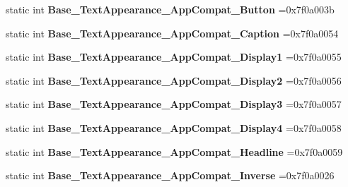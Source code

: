 \begin{DoxyCompactItemize}
\item 
\mbox{\label{classandroid_1_1support_1_1v4_1_1R_1_1style_afa2ce0c88c65b7ae88b6faaa1371018b}} 
static int {\bfseries Base\+\_\+\+Text\+Appearance\+\_\+\+App\+Compat\+\_\+\+Button} =0x7f0a003b
\item 
\mbox{\label{classandroid_1_1support_1_1v4_1_1R_1_1style_a923b05ee190310ce0260ee1a81f213df}} 
static int {\bfseries Base\+\_\+\+Text\+Appearance\+\_\+\+App\+Compat\+\_\+\+Caption} =0x7f0a0054
\item 
\mbox{\label{classandroid_1_1support_1_1v4_1_1R_1_1style_aede8f9fbd1158533fe7a834c97d7438f}} 
static int {\bfseries Base\+\_\+\+Text\+Appearance\+\_\+\+App\+Compat\+\_\+\+Display1} =0x7f0a0055
\item 
\mbox{\label{classandroid_1_1support_1_1v4_1_1R_1_1style_a1f5b35032ad33195285e40b0c9503da0}} 
static int {\bfseries Base\+\_\+\+Text\+Appearance\+\_\+\+App\+Compat\+\_\+\+Display2} =0x7f0a0056
\item 
\mbox{\label{classandroid_1_1support_1_1v4_1_1R_1_1style_a9cbe37e7754a3b8064842acfa5ce7192}} 
static int {\bfseries Base\+\_\+\+Text\+Appearance\+\_\+\+App\+Compat\+\_\+\+Display3} =0x7f0a0057
\item 
\mbox{\label{classandroid_1_1support_1_1v4_1_1R_1_1style_a1d153629094c1d70a59a0409aa381144}} 
static int {\bfseries Base\+\_\+\+Text\+Appearance\+\_\+\+App\+Compat\+\_\+\+Display4} =0x7f0a0058
\item 
\mbox{\label{classandroid_1_1support_1_1v4_1_1R_1_1style_a330c3906b620c4046d6d5970f4442261}} 
static int {\bfseries Base\+\_\+\+Text\+Appearance\+\_\+\+App\+Compat\+\_\+\+Headline} =0x7f0a0059
\item 
\mbox{\label{classandroid_1_1support_1_1v4_1_1R_1_1style_a960c4de60d8171a75e7ae7bdbc4deb26}} 
static int {\bfseries Base\+\_\+\+Text\+Appearance\+\_\+\+App\+Compat\+\_\+\+Inverse} =0x7f0a0026

\end{DoxyCompactItemize}
